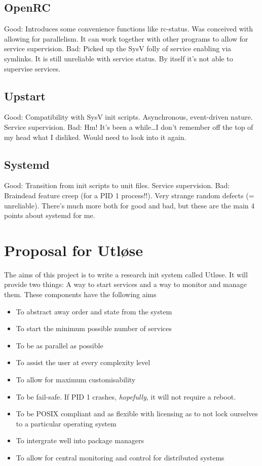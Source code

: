 \documentclass{article}
\begin{document}
\subsection{OpenRC}
Good: Introduces some convenience functions like rc-status. Was conceived with allowing
for parallelism. It can work together with other programs to allow for service supervision.
Bad: Picked up the SysV folly of service enabling via symlinks. It is still unreliable with
service status. By itself it's not able to supervise services.

\subsection{Upstart}
Good: Compatibility with SysV init scripts. Asynchronous, event-driven nature. Service
supervision. Bad: Hm! It's been a while\dots I don't remember off the top of my head what I
disliked. Would need to look into it again.

\subsection{Systemd}
Good: Transition from init scripts to unit files. Service supervision. Bad: Braindead
feature creep (for a PID 1 process!!). Very strange random defects (= unreliable). There's
much more both for good and bad, but these are the main 4 points about systemd for me.

\section{Proposal for Utløse}
The aims of this project is to write a research init system called Utløse. It will provide
two things: A way to start services and a way to monitor and manage them.
These components have the following aims
\begin{itemize}
    \item To abstract away order and state from the system
    \item To start the minimum possible number of services
    \item To be as parallel as possible
    \item To assist the user at every complexity level
    \item To allow for maximum customisability
    \item To be fail-safe. If PID 1 crashes, \textit{hopefully}, it will not require a reboot.
    \item To be POSIX compliant and as flexible with licensing as to not lock ourselves to a particular operating system
    \item To intergrate well into package managers
    \item To allow for central monitoring and control for distributed systems
\end{itemize}
\end{document}
